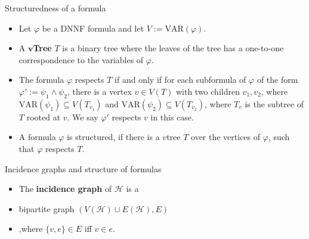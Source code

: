 \begin{frame}[t]{Structuredness of a formula}
	\begin{itemize}[<+->]
		\item Let $\varphi$ be a DNNF formula and let $V := \mathrm{VAR}(\varphi)$.
		\item A \textbf{$\mathbf{v}$Tree} $T$ is a binary tree where the leaves of the tree has a one-to-one correspondence to the variables of $\varphi$.
		\item The formula $\varphi$ respects $T$ if and only if for each subformula of $\varphi$ of the form $\varphi' := \psi_1 \land \psi_2$, there is a vertex $v \in V(T)$ with two children $v_1, v_2$, where $\mathrm{VAR}(\psi_1)\subseteq V(T_{v_1})$ and $\mathrm{VAR}(\psi_2) \subseteq V(T_{v_2})$, where $T_v$ is the subtree of $T$ rooted at $v$. We say $\varphi'$ respects $v$ in this case.
		\item A formula $\varphi$ is structured, if there is a $v$tree $T$ over the vertices of $\varphi$, such that $\varphi$ respects $T$.
	\end{itemize}

\end{frame}

\begin{frame}[t]{Incidence graphs and structure of formulas}
	\begin{itemize}
		\item The \textbf{incidence graph} of $\mathcal{H}$ is a 
		\item[] \hspace{1cm}bipartite graph $(V(\mathcal{H}) \cup E(\mathcal{H}), E)$
		\item[] \hspace{1cm},where $\{v, e\} \in E$ iff $v \in e$.
			\vspace{.5cm}


			\vspace{.5cm}
	\end{itemize}

\end{frame}

